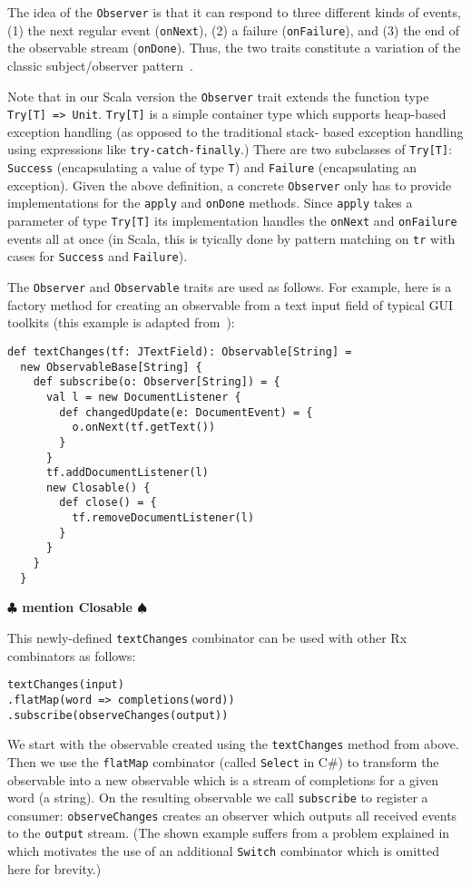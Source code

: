 \documentclass{acm_proc_article-sp}
\newcommand{\note}[1]{{\bf $\clubsuit$ #1 $\spadesuit$}}
\begin{document}
The idea of the \verb|Observer| is that it can respond to three different
kinds of events, (1) the next regular event (\verb|onNext|), (2) a failure
(\verb|onFailure|), and (3) the end of the observable stream (\verb|onDone|).
Thus, the two traits constitute a variation of the classic subject/observer
pattern~\cite{EugsterFGK03}.

Note that in our Scala version the \verb|Observer| trait extends the function
type \verb|Try[T] => Unit|. \verb|Try[T]| is a simple container type which
supports heap-based exception handling (as opposed to the traditional stack-
based exception handling using expressions like \verb|try-catch-finally|.)
There are two subclasses of \verb|Try[T]|: \verb|Success| (encapsulating a
value of type \verb|T|) and \verb|Failure| (encapsulating an exception). Given
the above definition, a concrete \verb|Observer| only has to provide
implementations for the \verb|apply| and \verb|onDone| methods. Since
\verb|apply| takes a parameter of type \verb|Try[T]| its implementation
handles the \verb|onNext| and \verb|onFailure| events all at once (in Scala,
this is tyically done by pattern matching on \verb|tr| with cases for
\verb|Success| and \verb|Failure|).

The \verb|Observer| and \verb|Observable| traits are used as follows. For
example, here is a factory method for creating an observable from a text input
field of typical GUI toolkits (this example is adapted from~\cite{RxCACM}):

\lstset{numbers=none,xleftmargin=0em}
\begin{lstlisting}
def textChanges(tf: JTextField): Observable[String] =
  new ObservableBase[String] {
    def subscribe(o: Observer[String]) = {
      val l = new DocumentListener {
        def changedUpdate(e: DocumentEvent) = {
          o.onNext(tf.getText())
        }
      }
      tf.addDocumentListener(l)
      new Closable() {
        def close() = {
          tf.removeDocumentListener(l)
        }
      }
    }
  }
\end{lstlisting}

\note{mention Closable}

This newly-defined \verb|textChanges| combinator can be used with other Rx
combinators as follows:

\begin{lstlisting}
textChanges(input)
.flatMap(word => completions(word))
.subscribe(observeChanges(output))
\end{lstlisting}

We start with the observable created using the \verb|textChanges| method from
above. Then we use the \verb|flatMap| combinator (called \verb|Select| in C\#)
to transform the observable into a new observable which is a stream of
completions for a given word (a string). On the resulting observable we call
\verb|subscribe| to register a consumer: \verb|observeChanges| creates an
observer which outputs all received events to the \verb|output| stream. (The
shown example suffers from a problem explained in~\cite{RxCACM} which
motivates the use of an additional \verb|Switch| combinator which is omitted
here for brevity.)
\end{document}
